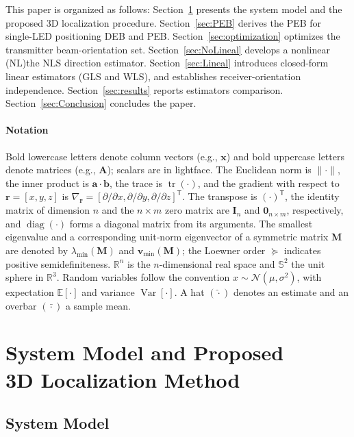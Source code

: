 \documentclass[journal]{IEEEtran}
\newcommand{\added}[1]{{\color{blue}#1}}
\newcommand{\deleted}[1]{{\color{red}#1}}
\begin{document}
This paper is organized as follows:
Section~\ref{sec:SystemModel} presents the system model and the proposed 3D localization procedure.
Section~\ref{sec:PEB} derives the \deleted{PEB for single-LED positioning} \added{DEB and PEB}.
Section~\ref{sec:optimization} optimizes the transmitter beam-orientation set.
Section~\ref{sec:NoLineal} develops \deleted{a nonlinear (NL)}\added{the NLS} direction estimator.
Section~\ref{sec:Lineal} introduces closed-form linear estimators (GLS and WLS)\added{, and establishes receiver-orientation independence}.
Section~\ref{sec:results} reports estimators comparison.
Section~\ref{sec:Conclusion} concludes the paper.

\paragraph*{Notation}
Bold lowercase letters denote column vectors (e.g., $\mathbf x$) and bold uppercase letters denote matrices (e.g., $\mathbf A$); scalars are in lightface. The Euclidean norm is $\lVert\cdot\rVert$, the inner product is $\mathbf a\!\cdot\!\mathbf b$, the trace is $\operatorname{tr}(\cdot)$, and the gradient with respect to $\mathbf{r}=[x,y,z]$ is $\nabla_{\mathbf r}=[\partial/\partial x,\partial/\partial y,\partial/\partial z]^{\mathsf T}$. The transpose is $(\cdot)^{\mathsf T}$, 
the identity matrix of dimension $n$ and the $n\times m$ zero matrix are $\mathbf{I}_n$ and $\mathbf{0}_{n\times m}$, respectively, and $\operatorname{diag}(\cdot)$ forms a diagonal matrix from its arguments. The smallest eigenvalue and a corresponding unit‐norm eigenvector of a symmetric matrix $\mathbf M$ are denoted by $\lambda_{\min}(\mathbf M)$ and $\mathbf v_{\min}(\mathbf M)$; the Loewner order $\succeq$ indicates positive semidefiniteness. $\mathbb R^n$ is the $n$-dimensional real space and $\mathbb S^{2}$ the unit sphere in $\mathbb R^{3}$. Random variables follow the convention $x\sim\mathcal N(\mu,\sigma^{2})$, with expectation $\mathbb E[\cdot]$ and variance $\operatorname{Var}[\cdot]$. A hat $(\hat{\cdot})$ denotes an estimate and an overbar $(\bar{\cdot})$ a sample mean. 

 
\section{System Model and Proposed \\3D Localization Method}
\label{sec:SystemModel}
\subsection{System Model}
\end{document}
